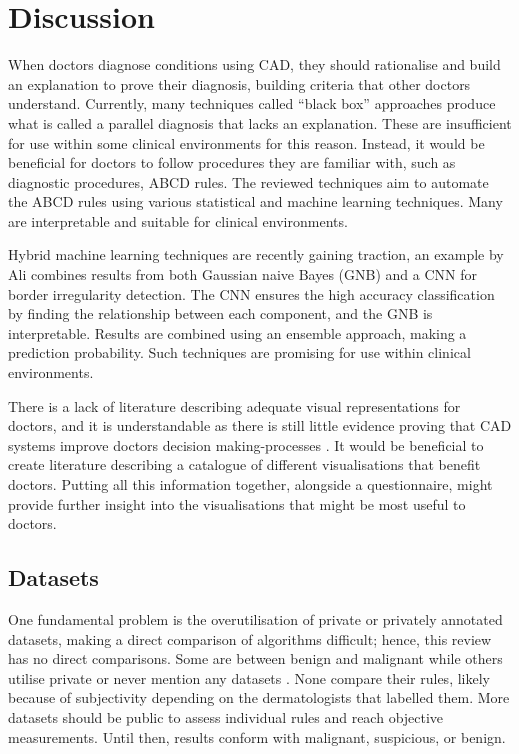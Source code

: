 \documentclass[10.5pt]{report}
\begin{document}
\section{Discussion}
When doctors diagnose conditions using CAD, they should rationalise and build an explanation to prove their diagnosis, building criteria that other doctors understand. Currently, many techniques \cite{Andre2017} called ``black box'' approaches produce what is called a parallel diagnosis that lacks an explanation. These are insufficient for use within some clinical environments for this reason. Instead, it would be beneficial for doctors to follow procedures they are familiar with, such as diagnostic procedures, ABCD rules. The reviewed techniques aim to automate the ABCD rules using various statistical and machine learning techniques. Many are interpretable and suitable for clinical environments.

Hybrid machine learning techniques are recently gaining traction, an example by Ali combines results from both Gaussian naive Bayes (GNB) and a CNN \cite{Ali2020b} for border irregularity detection. The CNN ensures the high accuracy classification by finding the relationship between each component, and the GNB is interpretable. Results are combined using an ensemble approach, making a prediction probability. Such techniques are promising for use within clinical environments.

There is a lack of literature describing adequate visual representations for doctors, and it is understandable as there is still little evidence proving that CAD systems improve doctors decision making-processes \cite{FerrantediRuffano2018}. It would be beneficial to create literature describing a catalogue of different visualisations that benefit doctors. Putting all this information together, alongside a questionnaire, might provide further insight into the visualisations that might be most useful to doctors.

\subsection{Datasets}
One fundamental problem is the overutilisation of private or privately annotated datasets, making a direct comparison of algorithms difficult; hence, this review has no direct comparisons. Some are between benign and malignant \cite{Meskini2018, Kasmi2016a, Ali2020b, Ali2020a} while others utilise private or never mention any datasets \cite{Kasmi2016a, She2007, Tenenhaus2010, Ramezani2014, Zaqout2016}. None compare their rules, likely because of subjectivity depending on the dermatologists that labelled them. More datasets should be public to assess individual rules and reach objective measurements. Until then, results conform with malignant, suspicious, or benign.
\end{document}
